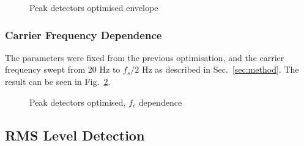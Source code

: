 \documentclass[../main2.tex]{subfiles}
\providecommand{\rootdir}{..}
\begin{document}
\begin{figure}[h]
\centerline{}
\caption{Peak detectors optimised envelope}
\label{fig:peak_det_opt_env}
\end{figure}

\subsubsection{Carrier Frequency Dependence}
The parameters were fixed from the previous optimisation, and the carrier frequency swept from 20 Hz to $f_s/2$ Hz as described in Sec.~\ref{sec:method}. The result can be seen in Fig.~\ref{fig:peak_det_opt_env_fc_dep}.

\begin{figure}[h]
\centerline{}
\caption{Peak detectors optimised, $f_c$ dependence}
\label{fig:peak_det_opt_env_fc_dep}
\end{figure}

\subsection{RMS Level Detection}
\end{document}
